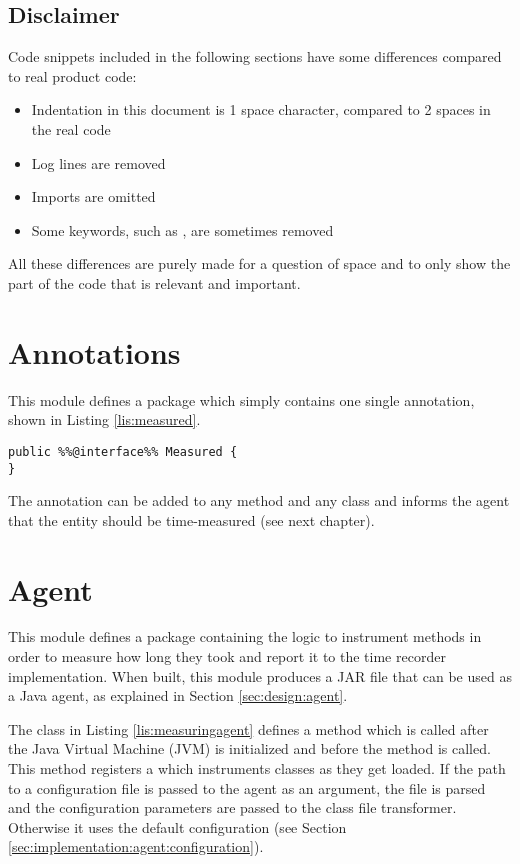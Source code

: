 \subsection{Disclaimer}
Code snippets included in the following sections have some differences compared to real product code:
\begin{itemize}
  \item Indentation in this document is 1 space character, compared to 2 spaces in the real code
  \item Log lines are removed
  \item Imports are omitted
  \item Some keywords, such as , are sometimes removed
\end{itemize}

\noindent All these differences are purely made for a question of space and to only show the part of the code that is relevant and important.

\section{Annotations}
\label{sec:implementation:annotations} 
This module defines a package  which simply contains one single annotation, shown in Listing \ref{lis:measured}.
\begin{lstlisting}[caption={Measured annotation},label=lis:measured]
public %%@interface%% Measured {
}
\end{lstlisting}

\noindent The annotation can be added to any method and any class and informs the agent that the entity should be time-measured (see next chapter).


\section{Agent}
\label{sec:implementation:agent} 
This module defines a package  containing the logic to instrument methods in order to measure how long they took and report it to the time recorder implementation. When built, this module produces a JAR file that can be used as a Java agent, as explained in Section \ref{sec:design:agent}.

\noindent The  class in Listing \ref{lis:measuringagent} defines a  method which is called after the Java Virtual Machine (JVM) is initialized and before the  method is called. This method registers a  which instruments classes as they get loaded. If the path to a configuration file is passed to the agent as an argument, the file is parsed and the configuration parameters are passed to the class file transformer. Otherwise it uses the default configuration (see Section \ref{sec:implementation:agent:configuration}).

